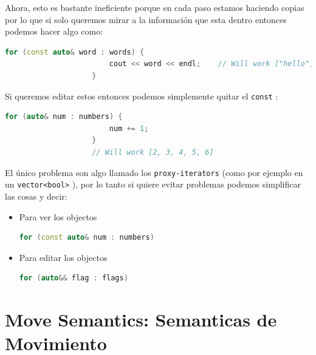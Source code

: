 \documentclass[12pt, fleqn]{report}                             %
\theoremstyle{break}                                            %
\newcommand{\textCode}[1]  { \texttt{#1} }                      %
\begin{document}
                Ahora, esto es bastante ineficiente porque en cada paso estamos haciendo copias
                por lo que si solo queremos mirar a la información que esta dentro entonces podemos hacer
                algo como:
                \begin{lstlisting}[language=C++, gobble=20]
                    for (const auto& word : words) {
                        cout << word << endl;    // Will work ["hello", "world", ":D"]
                    }
                \end{lstlisting}

                Si queremos editar estos entonces podemos simplemente quitar el \textCode{const}:
                \begin{lstlisting}[language=C++, gobble=20]
                    for (auto& num : numbers) {
                        num += 1;      
                    }
                    // Will work [2, 3, 4, 5, 6]
                \end{lstlisting}

                El único problema son algo llamado los \textCode{proxy-iterators} 
                (como por ejemplo en un \textCode{vector<bool>}), por lo tanto
                si quiere evitar problemas podemos simplificar las cosas y decir:
                \begin{itemize}
                    \item Para ver los objectos
                        \begin{lstlisting}[language=C++, gobble=28]
                            for (const auto& num : numbers)
                        \end{lstlisting}
                    \item Para editar los objectos
                        \begin{lstlisting}[language=C++, gobble=28]
                            for (auto&& flag : flags)
                        \end{lstlisting}
                \end{itemize}

                \cite{forauto}


        \clearpage
        \section{Move Semantics: Semanticas de Movimiento}     
        
\end{document}
